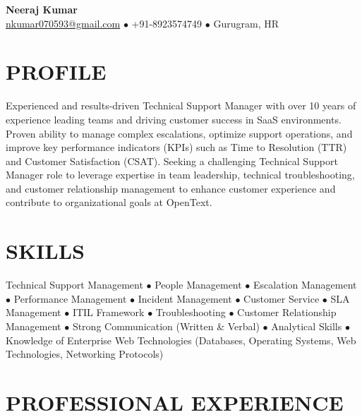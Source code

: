 \documentclass[11pt,a4paper]{article}
\begin{document}
\begin{center}
    {\huge \textbf{Neeraj Kumar}}\\[0.3em]
    \href{mailto:nkumar070593@gmail.com}{nkumar070593@gmail.com} $\bullet$ 
    +91-8923574749 $\bullet$ Gurugram, HR
\end{center}

\section*{PROFILE}
Experienced and results-driven Technical Support Manager with over 10 years of experience leading teams and driving customer success in SaaS environments. Proven ability to manage complex escalations, optimize support operations, and improve key performance indicators (KPIs) such as Time to Resolution (TTR) and Customer Satisfaction (CSAT). Seeking a challenging Technical Support Manager role to leverage expertise in team leadership, technical troubleshooting, and customer relationship management to enhance customer experience and contribute to organizational goals at OpenText.

\section*{SKILLS}
Technical Support Management $\bullet$ People Management $\bullet$ Escalation Management $\bullet$ Performance Management $\bullet$ Incident Management $\bullet$ Customer Service $\bullet$  SLA Management $\bullet$  ITIL Framework $\bullet$  Troubleshooting $\bullet$  Customer Relationship Management $\bullet$ Strong Communication (Written & Verbal) $\bullet$ Analytical Skills $\bullet$ Knowledge of Enterprise Web Technologies (Databases, Operating Systems, Web Technologies, Networking Protocols)

\section*{PROFESSIONAL EXPERIENCE}
\end{document}
